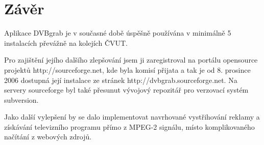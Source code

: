 \chapter{Závěr}
Aplikace DVBgrab je v současné době úspěšně používána v minimálně 5 instalacích převážně na kolejích ČVUT. 

\vspace{10pt}

Pro zajištění jejího dalšího zlepšování jsem ji zaregistroval na portálu opensource projektů http://sourceforge.net, kde byla komisí přijata a tak je od 8. prosince 2006 dostupná její instalace ze stránek http://dvbgrab.sourceforge.net. Na servery sourceforge byl také přesunut vývojový repozitář pro verzovací systém subversion.

\vspace{10pt}

Jako další vylepšení by se dalo implementovat navrhované vystřihování reklamy a získávání televizního programu přímo z MPEG-2 signálu, místo komplikovaného načítání z webových zdrojů.
